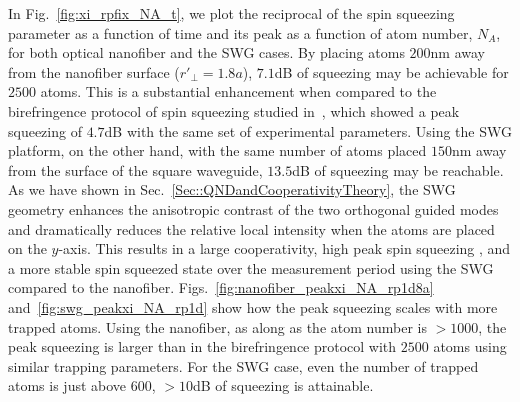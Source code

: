 \documentclass[aps,pra,twocolumn,superscriptaddress]{revtex4-1} %
\begin{document}
In Fig.~\ref{fig:xi_rpfix_NA_t}, we plot the reciprocal of the spin squeezing parameter as a function of time and its peak as a function of atom number, $ N_A $, for both optical nanofiber and the SWG cases. By placing atoms $ 200 $nm away from the nanofiber surface ($ r'\!_\perp=1.8a $), $ 7.1 $dB of squeezing may be achievable for $ 2500 $ atoms. This is a substantial enhancement when compared to the birefringence protocol of spin squeezing  studied in~\cite{Qi2016}, which showed a peak squeezing  of $ 4.7 $dB with the same set of experimental parameters. Using the SWG platform, on the other hand, with the same number of atoms placed $150 $nm away from the surface of the square waveguide, $13.5$dB of squeezing may be reachable. As we have shown in Sec.~\ref{Sec::QNDandCooperativityTheory}, the SWG geometry enhances the anisotropic contrast of the two orthogonal guided modes and dramatically reduces the relative local intensity when the atoms are placed on the $ y $-axis. This results in a large cooperativity, high peak spin squeezing , and a more stable spin squeezed state over the measurement period using the SWG compared to the nanofiber. Figs.~\ref{fig:nanofiber_peakxi_NA_rp1d8a} and~\ref{fig:swg_peakxi_NA_rp1d} show how the peak squeezing scales with more trapped atoms. Using the nanofiber, as along as the atom number is  $>1000 $, the peak  squeezing  is larger than in the birefringence protocol with $ 2500 $ atoms using similar trapping parameters. For the SWG case, even the number of trapped atoms is just above $ 600 $, $ >10 $dB of  squeezing is attainable.
\end{document}
